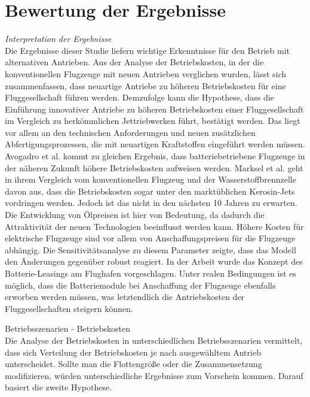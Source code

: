 
\section{Bewertung der Ergebnisse}
\label{s:Bewertung der Ergebnisse}

\textit{Interpretation der Ergebnisse}\\
Die Ergebnisse dieser Studie liefern wichtige Erkenntnisse für den Betrieb mit alternativen Antrieben.
Aus der Analyse der Betriebskosten, in der die konventionellen Flugzeuge mit neuen Antrieben verglichen wurden, 
lässt sich zusammenfassen, dass neuartige Antriebe zu höheren Betriebskosten für eine Fluggesellschaft führen werden.
Demzufolge kann die Hypothese, dass die Einführung innovativer Antriebe zu höheren 
Betriebskosten einer Fluggesellschaft im Vergleich zu herkömmlichen Jettriebwerken führt, bestätigt werden. 
Das liegt vor allem an den technischen Anforderungen und neuen zusätzlichen Abfertigungsprozessen, 
die mit neuartigen Kraftstoffen eingeführt werden müssen. 
Avogadro et al.\cite{avogadro2024demystifying} kommt zu gleichen Ergebnis, 
dass batteriebetriebene Flugzeuge in der näheren Zukunft höhere Betriebskosten aufweisen werden. 
Marksel et al. \cite{marksel2023comparative} geht in ihrem Vergleich vom konventionellen Flugzeug und der Wasserstoffbrennzelle davon aus, 
dass die Betriebskosten sogar unter den marktüblichen Kerosin-Jets vordringen werden. 
Jedoch ist das nicht in den nächsten 10 Jahren zu erwarten. 
Die Entwicklung von Ölpreisen ist hier von Bedeutung, 
da dadurch die Attraktivität der neuen Technologien beeinflusst werden kann.
%
Höhere Kosten für elektrische Flugzeuge sind vor allem von Anschaffungspreisen für die Flugzeuge abhängig. 
Die Sensitivitätsanalyse zu diesem Parameter zeigte, dass das Modell den Änderungen gegenüber robust reagiert.
In der Arbeit wurde das Konzept des Batterie-Leasings am Flughafen vorgeschlagen. 
Unter realen Bedingungen ist es möglich, dass die Batteriemodule bei Anschaffung 
der Flugzeuge ebenfalls erworben werden müssen, 
was letztendlich die Antriebskosten der Fluggesellschaften steigern können. 


Betriebsszenarien - Betriebskosten\\
Die Analyse der Betriebskosten in unterschiedlichen Betriebsszenarien vermittelt, 
dass sich Verteilung der Betriebskosten je nach ausgewähltem Antrieb unterscheidet. 
Sollte man die Flottengröße oder die Zusammensetzung modifizieren, 
würden unterschiedliche Ergebnisse zum Vorschein kommen.
Darauf basiert die zweite Hypothese. 

